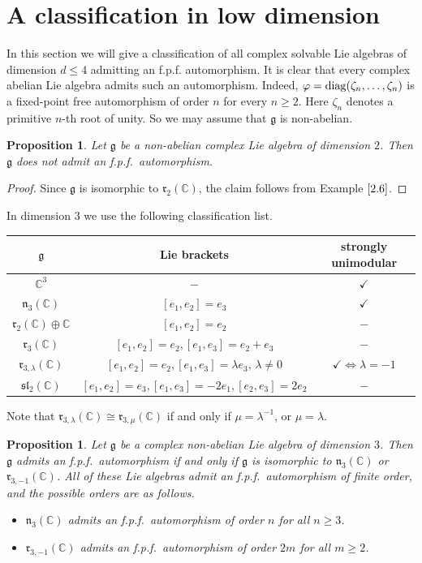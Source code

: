 \documentclass[12pt]{amsart}
\newtheorem{prop}[thm]{Proposition}
\theoremstyle{definition}
\theoremstyle{remark}
\newcommand{\C}{\mathbb{C}}
\newcommand{\diag}{\mathop{\rm diag}}
\newcommand{\Lg}{\mathfrak{g}}
\newcommand{\Ll}{\mathfrak{l}}
\newcommand{\Ln}{\mathfrak{n}}
\newcommand{\Lr}{\mathfrak{r}}
\newcommand{\Ls}{\mathfrak{s}}
\newcommand{\la}{\lambda}
\newcommand{\ck}{\checkmark}
\renewcommand{\phi}{\varphi}
\begin{document}
\section{A classification in low dimension}

In this section we will give a classification of all complex solvable Lie algebras of dimension $d\le 4$ admitting an
f.p.f. automorphism. It is clear that every complex abelian Lie algebra admits such an automorphism.
Indeed, $\phi=\diag (\zeta_n,\ldots ,\zeta_n)$ is a fixed-point free automorphism of order
$n$ for every $n\ge 2$. Here $\zeta_n$ denotes a primitive $n$-th root of unity. So we may assume that
$\Lg$ is non-abelian.

\begin{prop}\label{4.1}
Let $\Lg$ be a non-abelian complex Lie algebra of dimension $2$. Then $\Lg$ does not admit an f.p.f.\ automorphism.
\end{prop}

\begin{proof}
Since $\Lg$ is isomorphic to $\Lr_2(\C)$, the claim follows from Example $\ref{2.6}$.
\end{proof}  

In dimension $3$ we use the following classification list.
\vspace*{0.5cm}
\begin{center}
\begin{tabular}{c|c|c}
$\Lg$ & Lie brackets & strongly unimodular\\
\hline
$\C^3$ &  $-$ & $\ck$ \\
$\Ln_3(\C)$ & $[e_1,e_2]=e_3$ & $\ck$ \\
$\Lr_2(\C) \oplus  \C$ & $[e_1,e_2]=e_2$ & $-$ \\
$\Lr_3(\C)$ & $ [e_1,e_2]=e_2, [e_1,e_3]=e_2+e_3 $ & $-$ \\
$\Lr_{3,\la}(\C)$ & $[e_1,e_2]=e_2, [e_1,e_3]=\la e_3,\, \la\neq 0$ & $\ck \Leftrightarrow \la=-1$ \\
$\Ls\Ll_2(\C)$ & $[e_1,e_2]=e_3, [e_1,e_3]=-2 e_1,[e_2,e_3]=2 e_2$ & $-$ \\
\end{tabular}
\end{center}
\vspace*{0.5cm}
Note that $\Lr_{3,\la}(\C)\cong \Lr_{3,\mu}(\C)$ if and only if $\mu=\la^{-1}$, or $\mu=\la$.

\begin{prop}
Let $\Lg$ be a complex non-abelian Lie algebra of dimension $3$. Then
$\Lg$ admits an f.p.f.\ automorphism if and only if $\Lg$ is isomorphic to $\Ln_3(\C)$ or $\Lr_{3,-1}(\C)$.
All of these Lie algebras admit an f.p.f.\ automorphism of finite order, and
the possible orders are as follows.
\begin{itemize}
\item[(1)] $\Ln_3(\C)$ admits an f.p.f.\ automorphism of order $n$ for all $n\ge 3$.
\item[(2)] $\Lr_{3,-1}(\C)$ admits an f.p.f.\ automorphism of order $2m$ for all $m\ge 2$. 
\end{itemize}  
\end{prop}
\end{document}
